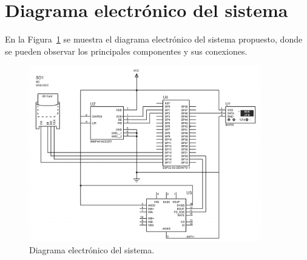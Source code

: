 \newpage
\section{Diagrama electrónico del sistema}

En la Figura~\ref{fig:diagrama_electronico} se muestra el diagrama electrónico del sistema propuesto, donde se pueden observar los principales componentes y sus conexiones.

\begin{figure}
    \centering
    \includegraphics[width=0.9\textwidth]{assets/cap_3/diagrama_electronico.png}
    \caption{Diagrama electrónico del sistema.}
    \label{fig:diagrama_electronico}
\end{figure}